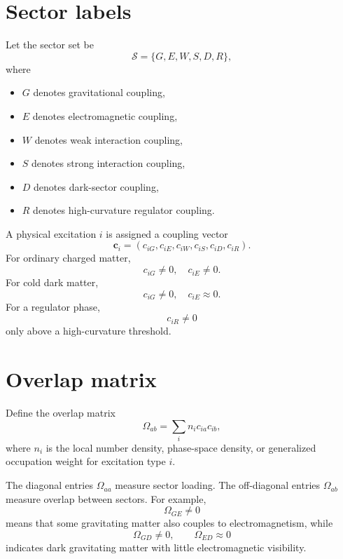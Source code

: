 \documentclass[11pt]{article}
\theoremstyle{remark}
\begin{document}
\section{Sector labels}
Let the sector set be
\begin{equation}
    \mathcal S=\{G,E,W,S,D,R\},
\end{equation}
where
\begin{itemize}[leftmargin=2em]
    \item $G$ denotes gravitational coupling,
    \item $E$ denotes electromagnetic coupling,
    \item $W$ denotes weak interaction coupling,
    \item $S$ denotes strong interaction coupling,
    \item $D$ denotes dark-sector coupling,
    \item $R$ denotes high-curvature regulator coupling.
\end{itemize}
A physical excitation $i$ is assigned a coupling vector
\begin{equation}
    \bm c_i=(c_{iG},c_{iE},c_{iW},c_{iS},c_{iD},c_{iR}).
\end{equation}
For ordinary charged matter,
\begin{equation}
    c_{iG}\neq 0,\quad c_{iE}\neq 0.
\end{equation}
For cold dark matter,
\begin{equation}
    c_{iG}\neq 0,\quad c_{iE}\approx 0.
\end{equation}
For a regulator phase,
\begin{equation}
    c_{iR}\neq 0
\end{equation}
only above a high-curvature threshold.

\section{Overlap matrix}
Define the overlap matrix
\begin{equation}
    \Omega_{ab}=\sum_i n_i c_{ia}c_{ib},
    \label{eq:overlap}
\end{equation}
where $n_i$ is the local number density, phase-space density, or generalized occupation weight for excitation type $i$.

The diagonal entries $\Omega_{aa}$ measure sector loading. The off-diagonal entries $\Omega_{ab}$ measure overlap between sectors. For example,
\begin{equation}
    \Omega_{GE}\neq 0
\end{equation}
means that some gravitating matter also couples to electromagnetism, while
\begin{equation}
    \Omega_{GD}\neq 0,\qquad \Omega_{ED}\approx 0
\end{equation}
indicates dark gravitating matter with little electromagnetic visibility.
\end{document}
